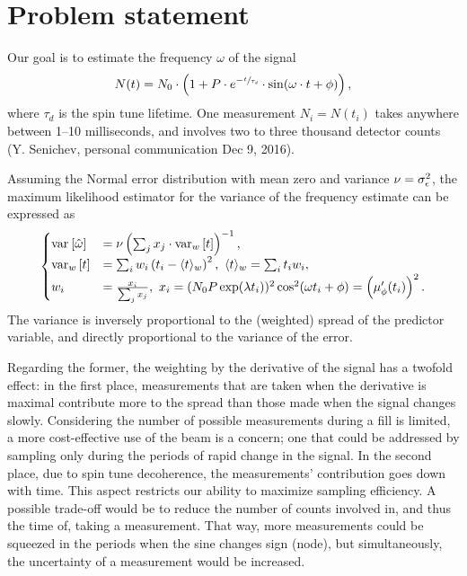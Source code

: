 \documentclass{article}
\begin{document}
	
\section*{Problem statement}

Our goal is to estimate the frequency $\omega$ of the signal
\begin{equation}
	N(t) = N_0\cdot\bkt{1 + P\cdot e^{-\sfrac{t}{\tau_d}}\cdot\sin(\omega\cdot t + \phi)},
\end{equation}
where $\tau_d$ is the spin tune lifetime. One measurement $N_i = N(t_i)$ takes anywhere between 1--10 milliseconds, and involves two to three thousand detector counts (Y. Senichev, personal communication Dec 9, 2016).

Assuming the Normal error distribution with mean zero and variance $\nu = \SD{\meas}^2$, the maximum likelihood estimator for the variance of the frequency estimate can be expressed as
\begin{equation}
\begin{cases}
\var{\hat\omega} &= \nu\bkt{\sum_j x_j\cdot \var[w]{t}}^{-1}, \\
\var[w]{t} &= \sum_i w_i \bkt{t_i - \avg{t}_w}^2,~ \avg{t}_w = \sum_i t_i w_i, \\
w_i &= \frac{x_i}{\sum_j x_j},~ x_i = (N_0P\exp(\lambda t_i))^2\cos^2(\omega t_i + \phi) = \bkt{\mupp}^2.
\end{cases}	
\end{equation}
The variance is inversely proportional to the (weighted) spread of the predictor variable, and directly proportional to the variance of the error. 

Regarding the former, the weighting by the derivative of the signal has a twofold effect: in the first place, measurements that are taken when the derivative is maximal contribute more to the spread than those made when the signal changes slowly. Considering the number of possible measurements during a fill is limited, a more cost-effective use of the beam is a concern; one that could be addressed by sampling only during the periods of rapid change in the signal. In the second place, due to spin tune decoherence, the measurements' contribution goes down with time. This aspect restricts our ability to maximize sampling efficiency. A possible trade-off would be to reduce the number of counts involved in, and thus the time of, taking a measurement. That way, more measurements could be squeezed in the periods when the sine changes sign (node), but simultaneously, the uncertainty of a measurement would be increased. 
\end{document}
